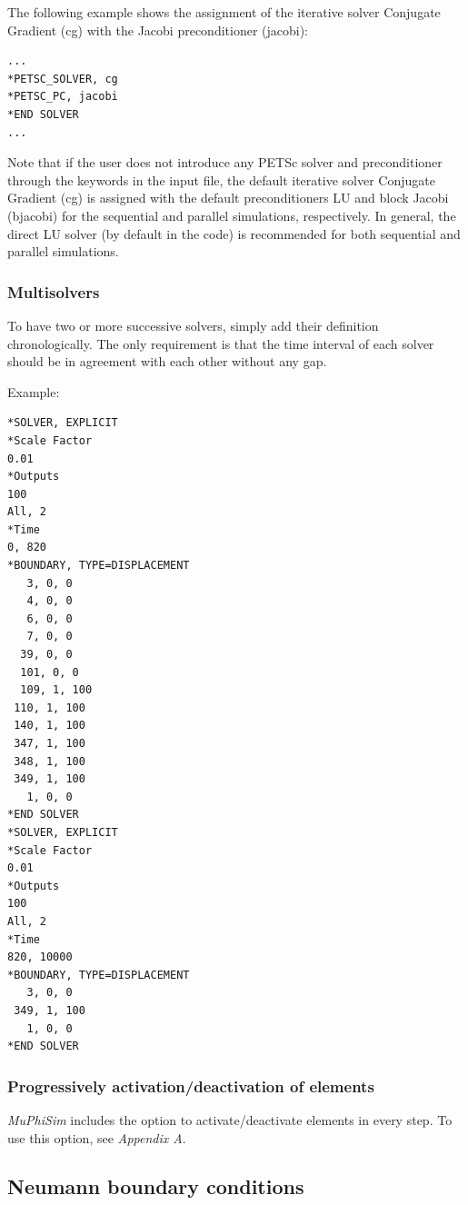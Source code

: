\documentclass[oneside,11pt,times]{book}
\begin{document}
The following example shows the assignment of the iterative solver Conjugate Gradient (cg) with the Jacobi preconditioner (jacobi):
\begin{lstlisting}
...
*PETSC_SOLVER, cg
*PETSC_PC, jacobi
*END SOLVER
...\end{lstlisting}
Note that if the user does not introduce any PETSc solver and preconditioner through the keywords in the input file, the default iterative solver Conjugate Gradient (cg) is assigned with the default preconditioners LU and block Jacobi (bjacobi) for the sequential and parallel simulations, respectively. In general, the direct LU solver (by default in the code) is recommended for both sequential and parallel simulations.

\subsubsection*{Multisolvers}
To have two or more successive solvers, simply add their definition chronologically. The only requirement is that the time interval of each solver should be in agreement with each other without any gap.

Example:
\begin{lstlisting}
*SOLVER, EXPLICIT
*Scale Factor
0.01
*Outputs
100
All, 2
*Time
0, 820
*BOUNDARY, TYPE=DISPLACEMENT
   3, 0, 0
   4, 0, 0
   6, 0, 0
   7, 0, 0
  39, 0, 0
  101, 0, 0
  109, 1, 100
 110, 1, 100
 140, 1, 100
 347, 1, 100
 348, 1, 100
 349, 1, 100
   1, 0, 0
*END SOLVER
*SOLVER, EXPLICIT
*Scale Factor
0.01
*Outputs
100
All, 2
*Time
820, 10000
*BOUNDARY, TYPE=DISPLACEMENT
   3, 0, 0
 349, 1, 100
   1, 0, 0
*END SOLVER
\end{lstlisting}
\subsubsection*{Progressively activation/deactivation of elements} \textit{MuPhiSim} includes the option to activate/deactivate elements in every step. To use this option, see
\textit{Appendix A}.
\subsection{Neumann boundary conditions}


\end{document}
